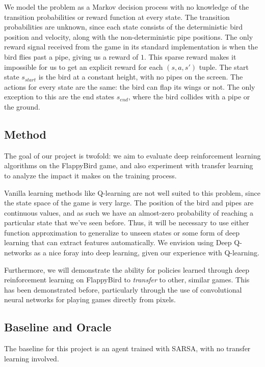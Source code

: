 \documentclass{article}
\begin{document}
We model the problem as a Markov decision process with no knowledge of the transition probabilities or reward function at every state.
The transition probabilities are unknown, since each state consists of the deterministic bird position and velocity, along with the non-deterministic pipe positions.
The only reward signal received from the game in its standard implementation is when the bird flies past a pipe, giving us a reward of $1$. 
This sparse reward makes it impossible for us to get an explicit reward for each $(s, a, s')$ tuple.
The start state $s_{start}$ is the bird at a constant height, with no pipes on the screen.
The actions for every state are the same: the bird can flap its wings or not.
The only exception to this are the end states $s_{end}$, where the bird collides with a pipe or the ground.

\subsection{Method}

The goal of our project is twofold: we aim to evaluate deep reinforcement learning algorithms on the FlappyBird game, and also experiment with transfer learning to analyze the impact it makes on the training process. 

Vanilla learning methods like Q-learning are not well suited to this problem, since the state space of the game is very large. The position of the bird and pipes are continuous values, and as such we have an almost-zero probability of reaching a particular state that we've seen before.
Thus, it will be necessary to use either function approximation to generalize to unseen states or some form of deep learning that can extract features automatically.
We envision using Deep Q-networks as a nice foray into deep learning, given our experience with Q-learning.


Furthermore, we will demonstrate the ability for policies learned through deep reinforcement learning on FlappyBird to \textit{transfer} to other, similar games.
This has been demonstrated before, particularly through the use of convolutional neural networks for playing games directly from pixels.

\subsection{Baseline and Oracle}
The baseline for this project is an agent trained with SARSA, with no transfer learning involved.
\end{document}
